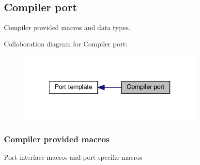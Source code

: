 \hypertarget{group__template__compiler}{\subsection{Compiler port}
\label{group__template__compiler}
}


Compiler provided macros and data types.  


Collaboration diagram for Compiler port\-:\nopagebreak
\begin{figure}[H]
\begin{center}
\leavevmode
\includegraphics[width=268pt]{group__template__compiler}
\end{center}
\end{figure}
\subsubsection*{Compiler provided macros}
\label{_amgrp0f21e649732376f8320c53f1472d5e53}%
Port interface macros and port specific macros

